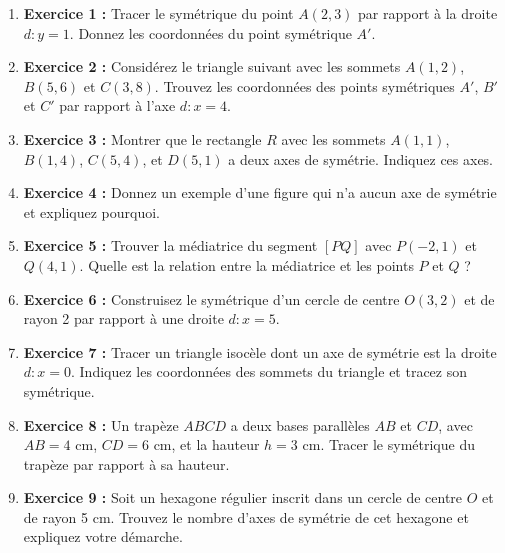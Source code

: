 \documentclass{article}
\begin{document}
\begin{tcolorbox}[colback=yellow!10!white, colframe=yellow!75!black, title=\textcolor{white}{Exercices}, sharp corners=south]
    \begin{enumerate}
        \item \textbf{Exercice 1 :} Tracer le symétrique du point \( A(2, 3) \) par rapport à la droite \( d: y = 1 \). Donnez les coordonnées du point symétrique \( A' \).
        
        \item \textbf{Exercice 2 :} Considérez le triangle suivant avec les sommets \( A(1, 2) \), \( B(5, 6) \) et \( C(3, 8) \). Trouvez les coordonnées des points symétriques \( A' \), \( B' \) et \( C' \) par rapport à l'axe \( d: x = 4 \).

        \item \textbf{Exercice 3 :} Montrer que le rectangle \( R \) avec les sommets \( A(1, 1) \), \( B(1, 4) \), \( C(5, 4) \), et \( D(5, 1) \) a deux axes de symétrie. Indiquez ces axes.

        \item \textbf{Exercice 4 :} Donnez un exemple d'une figure qui n'a aucun axe de symétrie et expliquez pourquoi.

        \item \textbf{Exercice 5 :} Trouver la médiatrice du segment \( [PQ] \) avec \( P(-2, 1) \) et \( Q(4, 1) \). Quelle est la relation entre la médiatrice et les points \( P \) et \( Q \) ?

        \item \textbf{Exercice 6 :} Construisez le symétrique d'un cercle de centre \( O(3, 2) \) et de rayon 2 par rapport à une droite \( d: x = 5 \).

        \item \textbf{Exercice 7 :} Tracer un triangle isocèle dont un axe de symétrie est la droite \( d: x = 0 \). Indiquez les coordonnées des sommets du triangle et tracez son symétrique.

        \item \textbf{Exercice 8 :} Un trapèze \( ABCD \) a deux bases parallèles \( AB \) et \( CD \), avec \( AB = 4 \) cm, \( CD = 6 \) cm, et la hauteur \( h = 3 \) cm. Tracer le symétrique du trapèze par rapport à sa hauteur.

        \item \textbf{Exercice 9 :} Soit un hexagone régulier inscrit dans un cercle de centre \( O \) et de rayon 5 cm. Trouvez le nombre d'axes de symétrie de cet hexagone et expliquez votre démarche.


\end{enumerate}
\end{tcolorbox}
\end{document}
